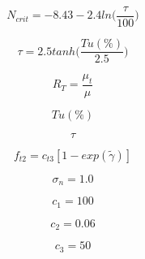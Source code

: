 {\newpage\clearpage
{}%
\begin{displaymath}
N_{crit} = -8.43 - 2.4 {ln} \Big( {\frac{\tau}{100}} \Big)
\end{displaymath}%
\lthtmldisplayZ
\lthtmlcheckvsize\clearpage}

{\newpage\clearpage
{}%
\begin{displaymath}
\tau =2.5 {tanh}\bigg(\frac{Tu(\%)}{2.5}\bigg)
\end{displaymath}%
\lthtmldisplayZ
\lthtmlcheckvsize\clearpage}

{\newpage\clearpage
{}%
\begin{displaymath}
R_T = \frac{\mu_t}{\mu}
\end{displaymath}%
\lthtmldisplayZ
\lthtmlcheckvsize\clearpage}

{\newpage\clearpage
{}%
\begin{displaymath}
Tu(\%)
\end{displaymath}%
\lthtmldisplayZ
\lthtmlcheckvsize\clearpage}

{\newpage\clearpage
{}%
\begin{displaymath}
\tau
\end{displaymath}%
\lthtmldisplayZ
\lthtmlcheckvsize\clearpage}

{\newpage\clearpage
{}%
\begin{displaymath}
f_{t2} = c_{t3}[1 - {exp}(\tilde{\gamma})]
\end{displaymath}%
\lthtmldisplayZ
\lthtmlcheckvsize\clearpage}

{\newpage\clearpage
{}%
\begin{displaymath}
\sigma_n = 1.0
\end{displaymath}%
\lthtmldisplayZ
\lthtmlcheckvsize\clearpage}

{\newpage\clearpage
{}%
\begin{displaymath}
c_1 = 100
\end{displaymath}%
\lthtmldisplayZ
\lthtmlcheckvsize\clearpage}

{\newpage\clearpage
{}%
\begin{displaymath}
c_2 = 0.06
\end{displaymath}%
\lthtmldisplayZ
\lthtmlcheckvsize\clearpage}

{\newpage\clearpage
{}%
\begin{displaymath}
c_3 = 50
\end{displaymath}%
\lthtmldisplayZ
\lthtmlcheckvsize\clearpage}

